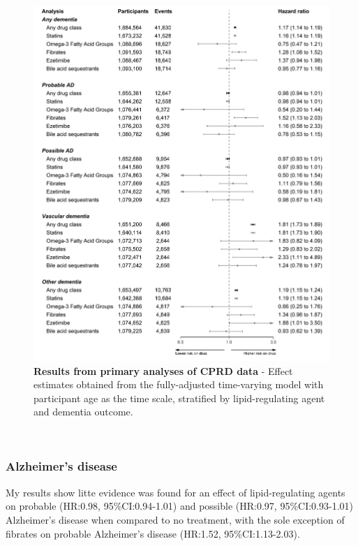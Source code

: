 \documentclass[a4paper, twoside]{templates/ociamthesis}
\begin{document}
\begin{figure}[H]
\includegraphics[width=1\linewidth]{figures/cprd-analysis/forester_p1} \caption[Results from primary analyses of CPRD data]{\textbf{Results from primary analyses of CPRD data} - Effect estimates obtained from the fully-adjusted time-varying model with participant age as the time scale, stratified by lipid-regulating agent and dementia outcome.}\label{fig:cprdPrimary}
\end{figure}

~

\hypertarget{alzheimers-disease}{%
\subsubsection{Alzheimer's disease}\label{alzheimers-disease}}

My results show litte evidence was found for an effect of lipid-regulating agents on probable (HR:0.98, 95\%CI:0.94-1.01) and possible (HR:0.97, 95\%CI:0.93-1.01) Alzheimer's disease when compared to no treatment, with the sole exception of fibrates on probable Alzheimer's disease (HR:1.52, 95\%CI:1.13-2.03).
\end{document}
